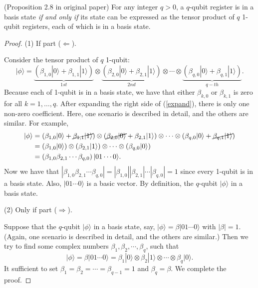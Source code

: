 \begin{proposition} (Proposition 2.8 in original paper) For any integer $q>0$, a $q$-qubit register is in a basis state \textit{if and only if} its state can be expressed as the tensor product of $q$ 1-qubit registers, each of which is in a basis state.
\end{proposition}
\begin{proof}

    (1) If part ($\Longleftarrow$).

    Consider the tensor product of $q$ 1-qubit:
    \begin{equation}
    \label{expand}
    |\phi\rangle=
    \underbrace{\left(\beta_{1,0}|0\rangle+\beta_{1,1}|1\rangle\right)}_{1st}
    \otimes
    \underbrace{\left(\beta_{2,0}|0\rangle+\beta_{2,1}|1\rangle\right) }_{2nd}
    \otimes    
    \cdots 
    \otimes
    \underbrace{\left(\beta_{q, 0}|0\rangle+\beta_{q, 1}|1\rangle\right)}_{q-th}
    .
\end{equation}
    Because each of 1-qubit is in a basis state, we have that either $\beta_{k,0}$ or $\beta_{k,1}$ is zero for all $k = 1, \dots, q$. After expanding the right side of (\ref{expand}), there is only one non-zero coefficient.
    Here, one scenario is described in detail, and the others are similar. For example,
    \begin{align}
        |\phi\rangle
        &=\left(\beta_{1,0}|0\rangle+\cancel{\beta_{1,1}|1\rangle} \right) \otimes\left(\cancel{\beta_{2,0}|0\rangle}+\beta_{2,1}|1\rangle\right) \otimes \cdots \otimes\left(\beta_{q, 0}|0\rangle+\cancel{\beta_{q, 1}|1\rangle}\right) \\
        &=\left(\beta_{1,0}|0\rangle\right)
        \otimes\left(\beta_{2,1}|1\rangle\right) 
        \otimes \cdots 
        \otimes\left(\beta_{q, 0}|0\rangle\right) \\
        &=\left(\beta_{1,0} \beta_{2,1} \cdots \beta_{q, 0} \right) |01 \cdots 0 \rangle.
    \end{align}
    Now we have that $|\beta_{1,0} \beta_{2,1} \cdots \beta_{q, 0}|
    =|\beta_{1,0}| |\beta_{2,1}| \cdots |\beta_{q, 0}|=1$ since every 1-qubit is in a basis state.
    Also, $|01 \cdots 0 \rangle$ is a basic vector. By definition, the $q$-qubit $|\phi\rangle$ in a basis state.

    (2) Only if part ($\Longrightarrow$).

    Suppose that the $q$-qubit $|\phi\rangle$ in a basis state, say, $|\phi\rangle=\beta|01 \cdots 0 \rangle$ with $\left|\beta\right|=1.$ (Again, one scenario is described in detail, and the others are similar.)
    Then we try to find some complex numbers $\beta_{1}, \beta_{2}, \cdots,\beta_{q}$, such that
    \begin{equation}
    |\phi\rangle=\beta|01 \cdots 0 \rangle
        =\beta_{1}|0\rangle
        \otimes\beta_{2}|1\rangle
        \otimes \cdots 
        \otimes\beta_{q}|0\rangle.
\end{equation}
    It sufficient to set $\beta_{1}=\beta_{2}=\cdots=\beta_{q-1}=1$ and $\beta_{q}=\beta$.
    We complete the proof.
\end{proof}